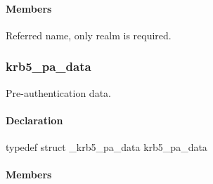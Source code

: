 \documentclass[letterpaper,10pt,english]{sphinxmanual}
\begin{document}
\paragraph{Members}
\label{appdev/refs/types/krb5_pa_svr_referral_data:members}

\begin{fulllineitems}
\label{appdev/refs/types/krb5_pa_svr_referral_data:krb5_pa_svr_referral_data.principal}
Referred name, only realm is required.

\end{fulllineitems}



\subsubsection{krb5\_pa\_data}
\label{appdev/refs/types/krb5_pa_data:krb5-pa-data}\label{appdev/refs/types/krb5_pa_data:krb5-pa-data-struct}\label{appdev/refs/types/krb5_pa_data::doc}

\begin{fulllineitems}
\label{appdev/refs/types/krb5_pa_data:krb5_pa_data}
\end{fulllineitems}


Pre-authentication data.


\paragraph{Declaration}
\label{appdev/refs/types/krb5_pa_data:declaration}
typedef struct \_krb5\_pa\_data  krb5\_pa\_data


\paragraph{Members}
\label{appdev/refs/types/krb5_pa_data:members}

\begin{fulllineitems}
\label{appdev/refs/types/krb5_pa_data:krb5_pa_data.magic}
\end{fulllineitems}

\end{document}
